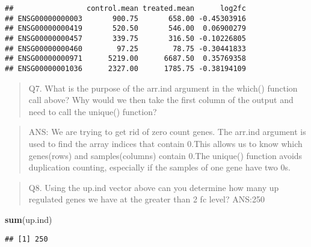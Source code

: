 \documentclass[
]{article}
\newenvironment{Shaded}{\begin{snugshade}}{\end{snugshade}}
\newcommand{\DecValTok}[1]{\textcolor[rgb]{0.00,0.00,0.81}{#1}}
\newcommand{\FunctionTok}[1]{\textcolor[rgb]{0.13,0.29,0.53}{\textbf{#1}}}
\newcommand{\NormalTok}[1]{#1}
\newcommand{\OtherTok}[1]{\textcolor[rgb]{0.56,0.35,0.01}{#1}}
\newcommand{\SpecialCharTok}[1]{\textcolor[rgb]{0.81,0.36,0.00}{\textbf{#1}}}
\begin{document}
\begin{verbatim}
##                 control.mean treated.mean      log2fc
## ENSG00000000003       900.75       658.00 -0.45303916
## ENSG00000000419       520.50       546.00  0.06900279
## ENSG00000000457       339.75       316.50 -0.10226805
## ENSG00000000460        97.25        78.75 -0.30441833
## ENSG00000000971      5219.00      6687.50  0.35769358
## ENSG00000001036      2327.00      1785.75 -0.38194109
\end{verbatim}

\begin{quote}
Q7. What is the purpose of the arr.ind argument in the which() function
call above? Why would we then take the first column of the output and
need to call the unique() function?
\end{quote}

\begin{quote}
ANS: We are trying to get rid of zero count genes. The arr.ind argument
is used to find the array indices that contain 0.This allows us to know
which genes(rows) and samples(columns) contain 0.The unique() function
avoids duplication counting, especially if the samples of one gene have
two 0s.
\end{quote}

\begin{Shaded}
\end{Shaded}

\begin{quote}
Q8. Using the up.ind vector above can you determine how many up
regulated genes we have at the greater than 2 fc level? ANS:250
\end{quote}

\begin{Shaded}
\begin{Highlighting}[]
\FunctionTok{sum}\NormalTok{(up.ind)}
\end{Highlighting}
\end{Shaded}

\begin{verbatim}
## [1] 250
\end{verbatim}
\end{document}
